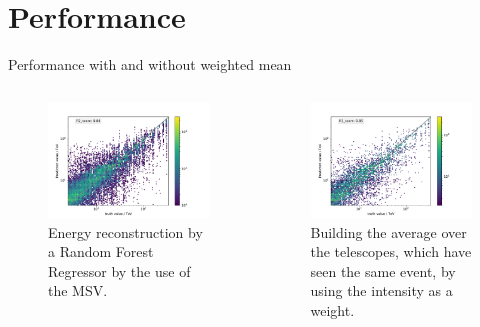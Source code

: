 \documentclass[aspectratio=1610, professionalfonts, 9pt]{beamer}
\begin{document}
\section{Performance}
  \begin{frame}{Performance with and without weighted mean}
      \begin{columns}
        \begin{column}{0.5\textwidth}
          \begin{figure}
            \centering
            \includegraphics[width=\textwidth]{Plots/RF_MSV.pdf}
            \caption{Energy reconstruction by a Random Forest Regressor by the use of the MSV.}
          \end{figure}
        \end{column}
        \begin{column}{0.5\textwidth}
          \begin{figure}
            \centering
            \includegraphics[width=\textwidth]{Plots/RF_MSV_wI_mean.pdf}
            \caption{Building the average over the telescopes, which have seen the same event, by using the intensity as a weight.}
          \end{figure}
        \end{column}
      \end{columns}
  \end{frame}
\end{document}
